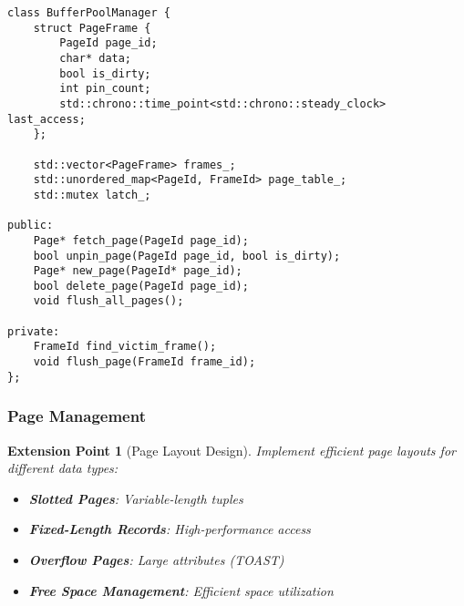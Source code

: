 \documentclass[12pt,a4paper]{article}
\newtheorem{extension}{Extension Point}[section]
\begin{document}
    \begin{lstlisting}[style=cpp, caption=Buffer Pool Manager Interface]
class BufferPoolManager {
    struct PageFrame {
        PageId page_id;
        char* data;
        bool is_dirty;
        int pin_count;
        std::chrono::time_point<std::chrono::steady_clock> last_access;
    };

    std::vector<PageFrame> frames_;
    std::unordered_map<PageId, FrameId> page_table_;
    std::mutex latch_;

public:
    Page* fetch_page(PageId page_id);
    bool unpin_page(PageId page_id, bool is_dirty);
    Page* new_page(PageId* page_id);
    bool delete_page(PageId page_id);
    void flush_all_pages();

private:
    FrameId find_victim_frame();
    void flush_page(FrameId frame_id);
};
    \end{lstlisting}

    \subsubsection{Page Management}

    \begin{extension}[Page Layout Design]
        Implement efficient page layouts for different data types:

        \begin{itemize}
            \item \textbf{Slotted Pages}: Variable-length tuples
            \item \textbf{Fixed-Length Records}: High-performance access
            \item \textbf{Overflow Pages}: Large attributes (TOAST)
            \item \textbf{Free Space Management}: Efficient space utilization
        \end{itemize}
    \end{extension}
\end{document}
